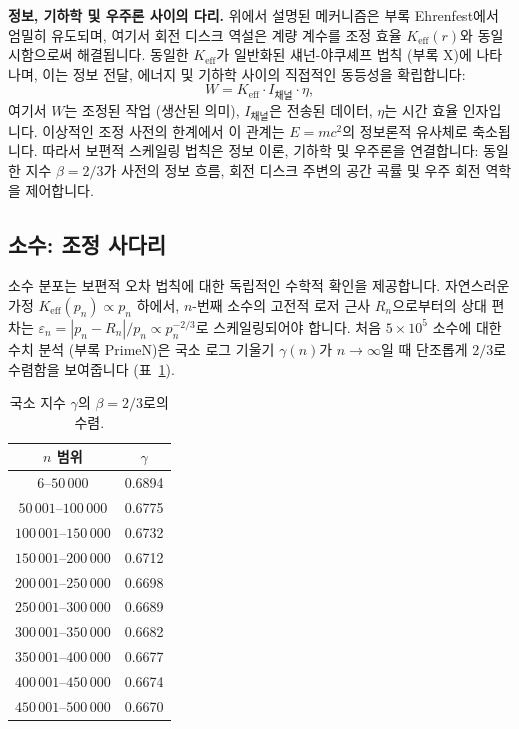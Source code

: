 \documentclass[11pt,a4paper]{article}
\begin{document}
	\textbf{정보, 기하학 및 우주론 사이의 다리.}
	위에서 설명된 메커니즘은 부록 Ehrenfest에서 엄밀히 유도되며, 여기서 회전 디스크 역설은 계량 계수를 조정 효율 \(K_{\mathrm{eff}}(r)\)와 동일시함으로써 해결됩니다. 동일한 \(K_{\mathrm{eff}}\)가 일반화된 섀넌-야쿠셰프 법칙 (부록 X)에 나타나며, 이는 정보 전달, 에너지 및 기하학 사이의 직접적인 동등성을 확립합니다:
	\begin{equation}
		W = K_{\mathrm{eff}} \cdot I_{\text{채널}} \cdot \eta,
	\end{equation}
	여기서 \(W\)는 조정된 작업 (생산된 의미), \(I_{\text{채널}}\)은 전송된 데이터, \(\eta\)는 시간 효율 인자입니다. 이상적인 조정 사전의 한계에서 이 관계는 \(E = mc^2\)의 정보론적 유사체로 축소됩니다. 따라서 보편적 스케일링 법칙은 정보 이론, 기하학 및 우주론을 연결합니다: 동일한 지수 \(\beta = 2/3\)가 사전의 정보 흐름, 회전 디스크 주변의 공간 곡률 및 우주 회전 역학을 제어합니다.
	
	\subsection{소수: 조정 사다리}
	
	소수 분포는 보편적 오차 법칙에 대한 독립적인 수학적 확인을 제공합니다. 자연스러운 가정 \(K_{\mathrm{eff}}(p_n) \propto p_n\) 하에서, \(n\)-번째 소수의 고전적 로저 근사 \(R_n\)으로부터의 상대 편차는 \(\varepsilon_n = |p_n - R_n|/p_n \propto p_n^{-2/3}\)로 스케일링되어야 합니다. 처음 \(5\times10^5\) 소수에 대한 수치 분석 (부록 PrimeN)은 국소 로그 기울기 \(\gamma(n)\)가 \(n\to\infty\)일 때 단조롭게 \(2/3\)로 수렴함을 보여줍니다 (표~\ref{tab:prime-slopes}).
	
	\begin{table}[H]
		\centering
		\caption{국소 지수 \(\gamma\)의 \(\beta = 2/3\)로의 수렴.}
		\label{tab:prime-slopes}
		\begin{tabular}{c c}
			\toprule
			\(n\) 범위 & \(\gamma\) \\
			\midrule
			\(6\)–\(50\,000\)    & 0.6894 \\
			\(50\,001\)–\(100\,000\) & 0.6775 \\
			\(100\,001\)–\(150\,000\)& 0.6732 \\
			\(150\,001\)–\(200\,000\)& 0.6712 \\
			\(200\,001\)–\(250\,000\)& 0.6698 \\
			\(250\,001\)–\(300\,000\)& 0.6689 \\
			\(300\,001\)–\(350\,000\)& 0.6682 \\
			\(350\,001\)–\(400\,000\)& 0.6677 \\
			\(400\,001\)–\(450\,000\)& 0.6674 \\
			\(450\,001\)–\(500\,000\)& 0.6670 \\
			\bottomrule
		\end{tabular}
	\end{table}
	
\end{document}
